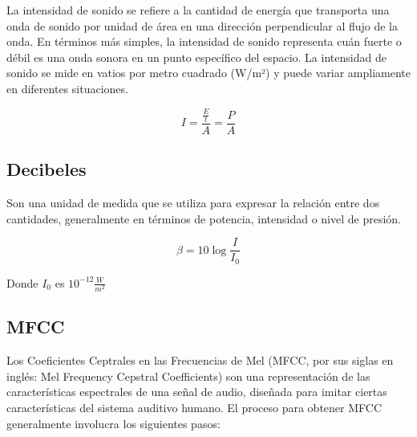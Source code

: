 \documentclass[letterpaper, 12pt]{article}
\begin{document}
La intensidad de sonido se refiere a la cantidad de energía
que transporta una onda de sonido por unidad de área en una
dirección perpendicular al flujo de la onda. En términos
más simples, la intensidad de sonido representa cuán fuerte
o débil es una onda sonora en un punto específico del
espacio. La intensidad de sonido se mide en vatios por
metro cuadrado (W/m²) y puede variar ampliamente en
diferentes situaciones.

\begin{equation*}
	I = \frac{\frac{E}{t}}{A} = \frac{P}{A}
\end{equation*}

\subsection*{Decibeles~\cite{diapos}}

Son una unidad de medida que se utiliza para expresar la
relación entre dos cantidades, generalmente en términos de
potencia, intensidad o nivel de presión.

\begin{equation*}
	\beta = 10 \log{\frac{I}{I_{0}}}
\end{equation*}

Donde $I_{0}$ es $10^{-12}\frac{W}{m^{2}}$

\subsection*{MFCC~\cite{mfcc}}

Los Coeficientes Ceptrales en las Frecuencias de Mel (MFCC,
por sus siglas en inglés: Mel Frequency Cepstral
Coefficients) son una representación de las características
espectrales de una señal de audio, diseñada para imitar
ciertas características del sistema auditivo humano. El
proceso para obtener MFCC generalmente involucra los
siguientes pasos:
\end{document}
